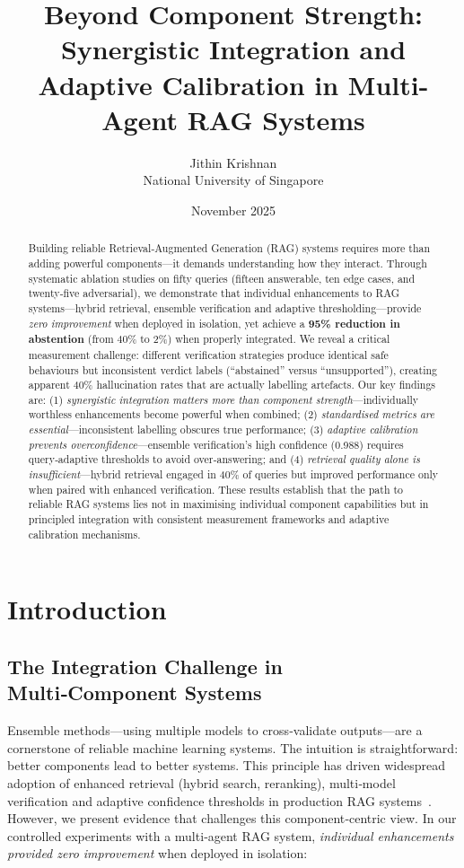 \documentclass{article}
\title{Beyond Component Strength: Synergistic Integration and Adaptive Calibration in Multi-Agent RAG Systems}
\author{Jithin Krishnan\\National University of Singapore}
\date{November 2025}
\begin{document}
\maketitle

\begin{abstract}
Building reliable Retrieval‑Augmented Generation (RAG) systems requires more than adding powerful components—it demands understanding how they interact. Through systematic ablation studies on fifty queries (fifteen answerable, ten edge cases, and twenty‑five adversarial), we demonstrate that individual enhancements to RAG systems—hybrid retrieval, ensemble verification and adaptive thresholding—provide \emph{zero improvement} when deployed in isolation, yet achieve a \textbf{95\% reduction in abstention} (from 40\% to 2\%) when properly integrated. We reveal a critical measurement challenge: different verification strategies produce identical safe behaviours but inconsistent verdict labels (“abstained” versus “unsupported”), creating apparent 40\% hallucination rates that are actually labelling artefacts. Our key findings are: (1) \emph{synergistic integration matters more than component strength}—individually worthless enhancements become powerful when combined; (2) \emph{standardised metrics are essential}—inconsistent labelling obscures true performance; (3) \emph{adaptive calibration prevents overconfidence}—ensemble verification’s high confidence (0.988) requires query‑adaptive thresholds to avoid over‑answering; and (4) \emph{retrieval quality alone is insufficient}—hybrid retrieval engaged in 40\% of queries but improved performance only when paired with enhanced verification. These results establish that the path to reliable RAG systems lies not in maximising individual component capabilities but in principled integration with consistent measurement frameworks and adaptive calibration mechanisms.
\end{abstract}

\section{Introduction}

\subsection{The Integration Challenge in Multi‑Component Systems}

Ensemble methods—using multiple models to cross‑validate outputs—are a cornerstone of reliable machine learning systems. The intuition is straightforward: better components lead to better systems. This principle has driven widespread adoption of enhanced retrieval (hybrid search, reranking), multi‑model verification and adaptive confidence thresholds in production RAG systems~\cite{lewis2020rag,shuster2021retaug,dhuliawala2024cove,he2024covrag}. However, we present evidence that challenges this component‑centric view. In our controlled experiments with a multi‑agent RAG system, \emph{individual enhancements provided zero improvement} when deployed in isolation:
\end{document}

